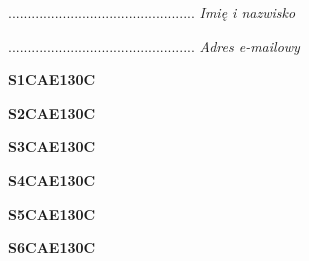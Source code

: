 \begin{turn}{90}\begin{minipage}{\linewidth} \vspace{20mm} ................................................  \textit{Imię i nazwisko}\end{minipage}\end{turn}

\begin{turn}{90}\begin{minipage}{\linewidth} \vspace{20mm} ................................................  \textit{Adres e-mailowy}\end{minipage}\end{turn}

\begin{turn}{90}\huge \begin{minipage}{\linewidth} \vspace{10mm}\textbf{S1CAE130C}\end{minipage}\end{turn}

\begin{turn}{90}\huge \begin{minipage}{\linewidth} \vspace{10mm}\textbf{S2CAE130C}\end{minipage}\end{turn}

\begin{turn}{90}\huge \begin{minipage}{\linewidth} \vspace{10mm}\textbf{S3CAE130C}\end{minipage}\end{turn}

\begin{turn}{90}\huge \begin{minipage}{\linewidth} \vspace{10mm}\textbf{S4CAE130C}\end{minipage}\end{turn}

\begin{turn}{90}\huge \begin{minipage}{\linewidth} \vspace{10mm}\textbf{S5CAE130C}\end{minipage}\end{turn}

\begin{turn}{90}\huge \begin{minipage}{\linewidth} \vspace{10mm}\textbf{S6CAE130C}\end{minipage}\end{turn}


